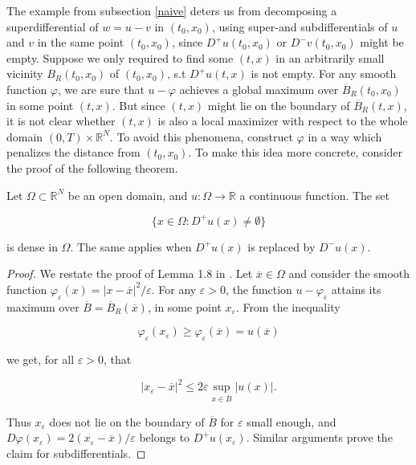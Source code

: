 The example from subsection \ref{naive} deters us from decomposing a superdifferential of $ w = u - v $ in $ (t_0, x_0) $, using super-and subdifferentials of $ u $ and $ v $ in the same point $ (t_0, x_0) $, since $ D^{+}u(t_0, x_0) $ or $ D^{-}v(t_0, x_0) $ might be empty. Suppose we only required to find some $ (t, x) $ in an arbitrarily small vicinity $ B_R(t_0, x_0) $ of $ (t_0, x_0) $, s.t $ D^{+}u(t, x) $ is not empty. For any smooth function $ \varphi $, we are sure that $ u - \varphi $ achieves a global maximum over $ \overline{B}_R(t_0, x_0) $ in some point $ (t, x) $. But since $ (t, x) $ might lie on the boundary of $ \overline{B}_R(t, x) $, it is not clear whether $ (t, x) $ is also a local maximizer with respect to the whole domain $ \left( 0, T \right) \times \mathbb{R}^{N} $. To avoid this phenomena, construct $ \varphi $ in a way which penalizes the distance from $ (t_0, x_0) $. To make this idea more concrete, consider the proof of the following theorem.
		
		\begin{theorem}
			\label{density}
			Let $ \Omega \subset \mathbb{R}^{N} $ be an open domain, and $ u : \Omega \to \mathbb{R} $ a continuous function. The set
			
			\begin{equation*}
				\big\{ x \in \Omega : D^{+}u(x) \neq \emptyset \big\}
			\end{equation*}
			
			is dense in $ \Omega $. The same applies when $ D^{+}u(x) $ is replaced by $ D^{-}u(x) $.
			
			\begin{proof}
				We restate the proof of Lemma 1.8 in \cite[p.~30]{bardi2008optimal}. Let $ \overline{x} \in \Omega $ and consider the smooth function $ \varphi_{\varepsilon}(x) = \lvert x - \overline{x} \rvert^2 /  \varepsilon $. For any $ \varepsilon > 0 $, the function $ u - \varphi_{\varepsilon} $ attains its maximum over $ \overline{B} = \overline{B}_R(\overline{x}) $, in some point $ x_{\varepsilon} $. From the inequality
				
				\begin{equation*}
					\varphi_{\varepsilon}(x_{\varepsilon}) \geq \varphi_{\varepsilon}(\overline{x}) = u(\overline{x})
				\end{equation*}
				
				we get, for all $ \varepsilon > 0 $, that
				
				\begin{equation*}
					\lvert x_{\varepsilon} - \overline{x} \rvert^2 \leq 2 \varepsilon \sup\limits_{x \in \overline{B}} \lvert u(x) \rvert .
				\end{equation*}
				
				Thus $ x_{\varepsilon} $ does not lie on the boundary of $ \overline{B} $ for $ \varepsilon $ small enough, and $ D\varphi(x_{\varepsilon}) = 2(x_{\varepsilon} - \overline{x}) / \varepsilon $ belongs to $ D^{+}u(x_{\varepsilon}) $. Similar arguments prove the claim for subdifferentials.
			\end{proof}
		\end{theorem}
	
